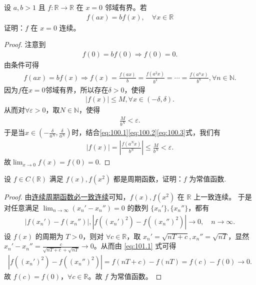 \documentclass[../../main.tex]{subfiles}
\begin{document}
\begin{example}
设 \(a,b > 1\) 且 \(f: \mathbb{R} \to \mathbb{R}\) 在 \(x = 0\) 邻域有界。若
\begin{align*}
f(ax) = bf(x),\quad \forall x \in \mathbb{R}
\end{align*}
证明：\(f\) 在 \(x = 0\) 连续。 
\end{example}
\begin{proof}
注意到
\begin{align*}
f(0) = bf(0) \Rightarrow f(0) = 0.
\end{align*}
由条件可得
\begin{align}
f(ax) = bf(x) \Rightarrow f(x) = \frac{f(ax)}{b} = \frac{f(a^2x)}{b^2} = \cdots = \frac{f(a^nx)}{b^n}, \forall n \in \mathbb{N}. \label{eq:100.1}
\end{align}
因为\(f\)在\(x=0\)邻域有界，所以存在\(\delta > 0\)，使得
\begin{align}
|f(x)| \leqslant M, \forall x \in (-\delta, \delta). \label{eq:100.2}
\end{align}
从而对\(\forall \varepsilon > 0\)，取\(N \in \mathbb{N}\)，使得
\begin{align}
\frac{M}{b^N} < \varepsilon. \label{eq:100.3}
\end{align}
于是当\(x \in \left( -\frac{\delta}{a^N}, \frac{\delta}{a^N} \right)\)时，结合\eqref{eq:100.1}\eqref{eq:100.2}\eqref{eq:100.3}式，我们有
\begin{align*}
|f(x)| = \left| \frac{f(a^Nx)}{b^N} \right| \leqslant \frac{M}{b^N} < \varepsilon.
\end{align*}
故\(\lim_{x \to 0} f(x) = f(0) = 0.\)
\end{proof}

\begin{example}
设 \(f \in C(\mathbb{R})\) 满足 \(f(x), f(x^2)\) 都是周期函数，证明：\(f\) 为常值函数. 
\end{example}
\begin{proof}
由\hyperref[proposition:连续周期函数必一致连续]{连续周期函数必一致连续}可知，\(f(x),f(x^2)\) 在 \(\mathbb{R}\) 上一致连续。
于是对任意满足 \(\lim_{n \to \infty} (x_n' - x_n'') = 0\) 的数列 \(\{x_n'\}, \{x_n''\}\)，都有
\begin{align}
|f(x_n') - f(x_n'')|, |f((x_n')^2) - f((x_n'')^2)| \to 0, \quad n \to \infty. \label{eq:101.1}
\end{align}
设 \(f(x)\) 的周期为 \(T > 0\)，则对 \(\forall c \in \mathbb{R}\)，取 \(x_n' = \sqrt{nT + c}, x_n'' = \sqrt{nT}\)，显然 \(x_n' - x_n'' = \frac{c}{\sqrt{nT + c} + \sqrt{nT}} \to 0\)。从而由 \eqref{eq:101.1} 式可得
\begin{align*}
|f((x_n')^2) - f((x_n'')^2)| = f(nT + c) - f(nT) = f(c) - f(0) \to 0.
\end{align*}
故 \(f(c) = f(0)\)，\(\forall c \in \mathbb{R}\)。故 \(f\) 为常值函数。
\end{proof}
\end{document}
